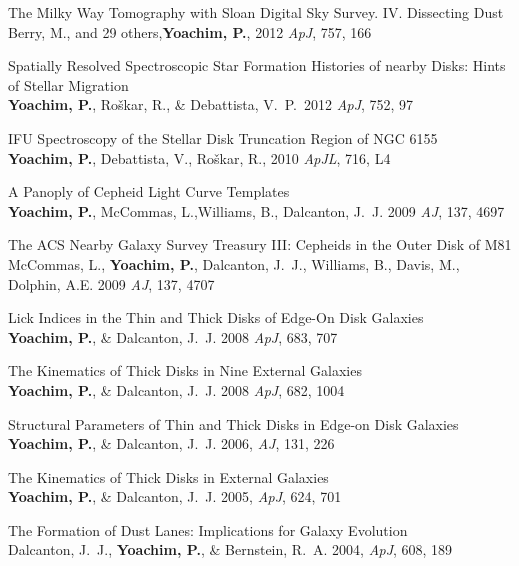 \documentclass[10pt]{cv}
\begin{document}
\begin{llist}





{\sc The Milky Way Tomography with Sloan Digital Sky Survey. IV. Dissecting Dust}\\
Berry, M., and 29 others,{\bf Yoachim, P.}, 2012 {\em ApJ}, 757,  166

{\sc Spatially Resolved Spectroscopic Star Formation Histories of nearby Disks: Hints of Stellar Migration} \\
{\bf Yoachim, P.}, Ro{\v s}kar, R., \& Debattista, V.~P.\  2012 {\em ApJ}, 752,  97

{\sc IFU Spectroscopy of the Stellar Disk Truncation Region of NGC 6155} \\
{\bf Yoachim, P.},  Debattista, V., Ro{\v s}kar, R., 2010 {\em ApJL}, 716, L4

{\sc A Panoply of Cepheid Light Curve Templates}\\
{\bf Yoachim, P.}, McCommas, L.,Williams, B., Dalcanton, J.~J. 2009 {\em AJ}, 137, 4697

{\sc The ACS Nearby Galaxy Survey Treasury III:  Cepheids in the Outer Disk of M81}\\
 McCommas, L., {\bf Yoachim, P.}, Dalcanton, J.~J., Williams, B., Davis, M., Dolphin, A.E. 2009 {\em AJ}, 137, 4707

{\sc Lick Indices in the Thin and Thick Disks of Edge-On Disk Galaxies}\\
{\bf Yoachim, P.}, \& Dalcanton, J.~J. 2008 {\em ApJ}, 683, 707

{\sc The Kinematics of Thick Disks in Nine External Galaxies}\\
{\bf Yoachim, P.}, \& Dalcanton, J.~J. 2008 {\em ApJ}, 682, 1004

{\sc Structural Parameters of Thin and Thick Disks in Edge-on Disk Galaxies}\\
{\bf Yoachim, P.}, \& Dalcanton, J.~J. 2006, {\em AJ}, 131, 226

{\sc The Kinematics of Thick Disks in External Galaxies}\\
{\bf Yoachim, P.}, \& Dalcanton, J.~J. 2005, {\em ApJ}, 624, 701

{\sc The Formation of Dust Lanes: Implications for Galaxy Evolution}\\
Dalcanton, J.~J., {\bf Yoachim, P.}, \& Bernstein, R.~A. 2004, {\em ApJ}, 608,
189


\end{llist}
\end{document}
